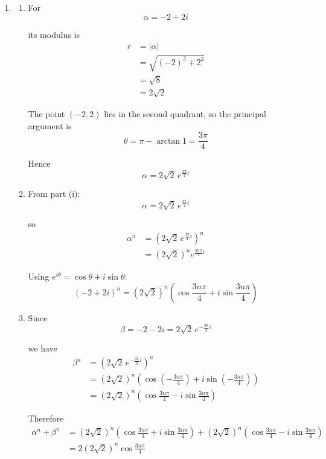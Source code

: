 \documentclass[leqno]{article}
\begin{document}
\begin{enumerate}[
  label=\textbf{\arabic*.},
  leftmargin=*,
  topsep=0pt,
  partopsep=0pt,
  parsep=0pt
]
\begin{djsSolution}
\begin{enumerate}[label=\textbf{(\alph*)}]
\begin{enumerate}[label=(\roman*)]
    Therefore
    \[
    q=8+12=20
    \]

    So the values are
    \[
    p=7,\qquad q=20
    \]
  \end{enumerate}

  \item
  \begin{enumerate}[label=(\roman*)]
    \item For
    \[
    \alpha=-2+2i
    \]

    its modulus is
    \begin{align*}
    r&=|\alpha|\\
    &=\sqrt{(-2)^2+2^2}\\
    &=\sqrt{8}\\
    &=2\sqrt{2}
    \end{align*}

    The point $(-2,2)$ lies in the second quadrant, so the principal argument is
    \[
    \theta=\pi-\arctan 1=\frac{3\pi}{4}
    \]

    Hence
    \[
    \alpha=2\sqrt{2}\,e^{\frac{3\pi}{4}i}
    \]

    \item From part (i):
    \[
    \alpha=2\sqrt{2}\,e^{\frac{3\pi}{4}i}
    \]

    so
    \begin{align*}
    \alpha^n&=\left(2\sqrt{2}\,e^{\frac{3\pi}{4}i}\right)^n\\
    &=(2\sqrt{2})^n e^{\frac{3n\pi}{4}i}
    \end{align*}

    Using $e^{i\theta}=\cos\theta+i\sin\theta$:
    \[
    (-2+2i)^n=(2\sqrt{2})^n\left(\cos\frac{3n\pi}{4}+i\sin\frac{3n\pi}{4}\right)
    \]

    \item Since
    \[
    \beta=-2-2i=2\sqrt{2}\,e^{-\frac{3\pi}{4}i}
    \]

    we have
    \begin{align*}
    \beta^n&=\left(2\sqrt{2}\,e^{-\frac{3\pi}{4}i}\right)^n\\
    &=(2\sqrt{2})^n\left(\cos\left(-\frac{3n\pi}{4}\right)+i\sin\left(-\frac{3n\pi}{4}\right)\right)\\
    &=(2\sqrt{2})^n\left(\cos\frac{3n\pi}{4}-i\sin\frac{3n\pi}{4}\right)
    \end{align*}

    Therefore
    \begin{align*}
    \alpha^n+\beta^n
    &=(2\sqrt{2})^n\left(\cos\frac{3n\pi}{4}+i\sin\frac{3n\pi}{4}\right)
      +(2\sqrt{2})^n\left(\cos\frac{3n\pi}{4}-i\sin\frac{3n\pi}{4}\right)\\
    &=2(2\sqrt{2})^n\cos\frac{3n\pi}{4}
    \end{align*}


\end{enumerate}
\end{enumerate}
\end{djsSolution}
\end{enumerate}
\end{document}
